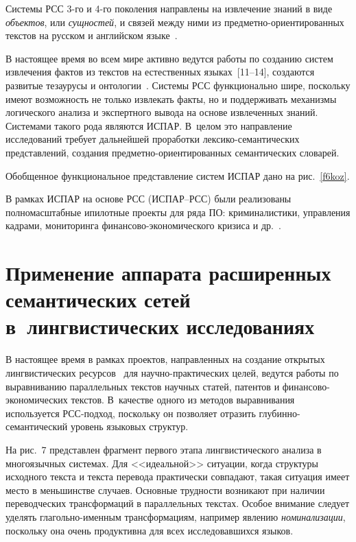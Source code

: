 \begin{multicols}{2}
Системы РСС 3-го и 4-го поколения на\-прав\-ле\-ны на извлечение знаний 
в виде \textit{объектов}, или \textit{сущностей}, и связей между ними из 
пред\-мет\-но-ориен\-ти\-ро\-ван\-ных текстов на русском и английском 
языке~\cite{18koz, 19koz}.

    
В настоящее время во всем мире активно ведутся работы по созданию 
систем извлечения фактов из текстов на естественных языках~[11--14], создаются развитые тезаурусы и 
онтологии~\cite{17koz}. Сис\-те\-мы РСС функционально шире, поскольку 
имеют возможность не только извлекать факты, но и поддерживать 
механизмы логического анализа и экспертного вывода на основе 
извлеченных знаний. Сис\-те\-ма\-ми такого рода являются ИСПАР. В~целом это 
направление исследований требует дальнейшей проработки 
     лек\-си\-ко-се\-ман\-ти\-че\-ских представлений, создания 
     пред\-мет\-но-ориен\-ти\-ро\-ван\-ных семантических словарей. 

Обобщенное функциональное представление систем ИСПАР дано на 
рис.~\ref{f6koz}. 
     
     В рамках ИСПАР на основе РСС 
(\mbox{ИСПАР}--РСС) были реализованы полномасштабные и\linebreak пилотные 
проекты для ряда ПО: криминалистики, управления 
кадрами, мониторинга финансово-экономического кризиса и 
др.~\cite{18koz, 19koz}.

\section{Применение аппарата расширенных семантических сетей в~лингвистических 
исследованиях}
     
     В настоящее время в рамках проектов, на\-прав\-лен\-ных на создание 
открытых лингвистических ресурсов~\cite{20koz} для 
     на\-уч\-но-прак\-ти\-че\-ских целей, ведутся работы по выравниванию 
параллельных текстов научных статей, патентов и 
     фи\-нан\-со\-во-эко\-но\-ми\-че\-ских текстов. В~качестве одного из 
методов выравнивания используется РСС-под\-ход, поскольку он позволяет 
отразить глу\-бин\-но-се\-ман\-ти\-че\-ский уровень языковых структур. 

На  рис.~7 представлен фрагмент первого этапа лингвистического 
анализа в многоязычных системах. Для <<идеальной>> ситуации, когда 
структуры исходного текста и текста перевода практически совпадают, такая 
ситуация имеет место в меньшинстве случаев. Основные трудности 
возникают при наличии переводческих трансформаций в параллельных 
текстах. Особое внимание следует уделять гла\-голь\-но-имен\-ным 
трансформациям, например явлению \textit{номинализации}, поскольку она 
очень продуктивна для всех исследовавшихся языков.


\end{multicols}
